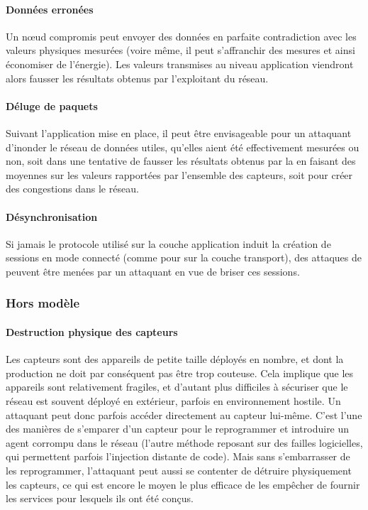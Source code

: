         \paragraph{Données erronées}
Un nœud compromis peut envoyer des données en parfaite contradiction avec les valeurs physiques mesurées (voire même, il peut s'affranchir des mesures et ainsi économiser de l'énergie).
Les valeurs transmises au niveau application viendront alors fausser les résultats obtenus par l'exploitant du réseau.

        \paragraph{Déluge de paquets}
Suivant l'application mise en place, il peut être envisageable pour un attaquant d'inonder le réseau de données utiles, qu'elles aient été effectivement mesurées ou non, soit dans une tentative de fausser les résultats obtenus par la \sdb en faisant des moyennes sur les valeurs rapportées par l'ensemble des capteurs, soit pour créer des congestions dans le réseau.

        \paragraph{Désynchronisation}
Si jamais le protocole utilisé sur la couche application induit la création de sessions en mode connecté (comme pour \tcp sur la couche transport), des attaques de \desync peuvent être menées par un attaquant en vue de briser ces sessions.

    \subsubsection{Hors modèle}
        \paragraph{Destruction physique des capteurs}
Les capteurs sont des appareils de petite taille déployés en nombre, et dont la production ne doit par conséquent pas être trop couteuse.
Cela implique que les appareils sont relativement fragiles, et d'autant plus difficiles à sécuriser que le réseau est souvent déployé en extérieur, parfois en environnement hostile.
Un attaquant peut donc parfois accéder directement au capteur lui-même.
C'est l'une des manières de s'emparer d'un capteur pour le reprogrammer et introduire un agent corrompu dans le réseau (l'autre méthode reposant sur des failles logicielles, qui permettent parfois l'injection distante de code).
Mais sans s'embarrasser de les reprogrammer, l'attaquant peut aussi se contenter de détruire physiquement les capteurs, ce qui est encore le moyen le plus efficace de les empêcher de fournir les services pour lesquels ils ont été conçus.

